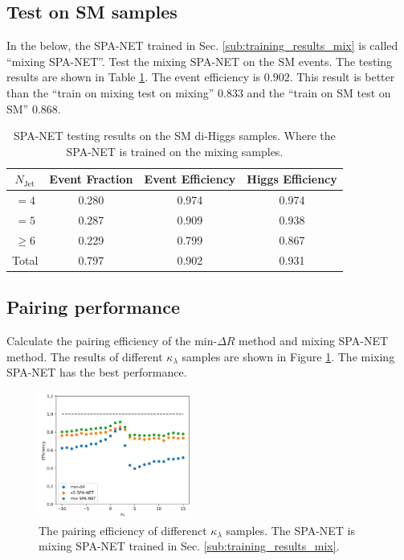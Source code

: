 \documentclass[12pt]{article}
\begin{document}
	\subsection{Test on SM samples}%
	\label{sub:test_on_sm_samples}
	In the below, the SPA-NET trained in Sec. \ref{sub:training_results_mix} is called ``mixing SPA-NET''. Test the mixing SPA-NET on the SM events. The testing results are shown in Table \ref{tab:SPANet_train_mix_test_SM}. The event efficiency is $0.902$. This result is better than the ``train on mixing test on mixing'' $0.833$ and the ``train on SM test on SM'' $0.868$.
		\begin{table}[htpb]
			\centering
			\caption{SPA-NET testing results on the SM di-Higgs samples. Where the SPA-NET is trained on the mixing samples.}
			\label{tab:SPANet_train_mix_test_SM}
			\begin{tabular}{c|c|cc}
				$N_\text{Jet}$ & Event Fraction & Event Efficiency & Higgs Efficiency \\
				\hline
				$=4$	  &   0.280             &    0.974              &    0.974             \\
				$=5$	  &   0.287             &    0.909              &    0.938             \\
				$\ge 6$	  &   0.229             &    0.799              &    0.867             \\
				Total	  &   0.797             &    0.902              &    0.931             \\
			\end{tabular}
		\end{table}
	\subsection{Pairing performance}%
	\label{sub:pairing_performance}
		Calculate the pairing efficiency of the $\text{min-}\Delta R$ method and mixing SPA-NET method. The results of different $\kappa_\lambda$ samples are shown in Figure \ref{fig:pairing_efficiency_kappa_mix}. The mixing SPA-NET has the best performance.
		\begin{figure}[htpb]
			\centering
			\includegraphics[width=0.45\textwidth]{pairing_efficiency_kappa-mix.png}
			\caption{The pairing efficiency of differenct $\kappa_\lambda $ samples. The SPA-NET is mixing SPA-NET trained in Sec. \ref{sub:training_results_mix}.}
			\label{fig:pairing_efficiency_kappa_mix}
		\end{figure}
\end{document}
